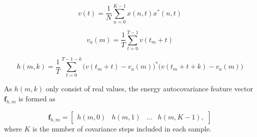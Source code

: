 \begin{equation}
	v(t) = \frac{1}{N}\sum_{n=0}^{K-1}x(n,t)x^*(n,t)
\end{equation}

\begin{equation} 
	v_a(m) = \frac{1}{T}\sum_{t=0}^{T-1}v(t_m+t)
\end{equation}

\begin{equation}
	h(m,k) = \frac{1}{T}\sum_{t=0}^{T-1-k}\big(v(t_m+t) - v_a(m)\big)^*\big(v(t_m+t+k) - v_a(m)\big)
\end{equation}

As $h(m,k)$ only consist of real values, the energy autocovariance feature vector $\mathbf{f}_{h,m}$ is formed as

\begin{equation}
	\mathbf{f}_{h,m} = 
	\begin{bmatrix}
		h(m,0) & h(m,1) & ... & h(m,K-1),
	\end{bmatrix}
\end{equation}
where $K$ is the number of covariance steps included in each sample. 




